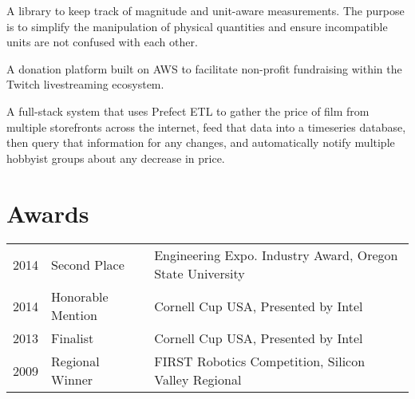 \documentclass[letterpaper]{deedy-resume} %
\begin{document}
\begin{minipage}[t]{0.99\textwidth}
\sectionspace %



A library to keep track of magnitude and unit-aware measurements.
The purpose is to simplify the manipulation of physical quantities and ensure incompatible units are not confused with each other.

\sectionspace %



A donation platform built on AWS to facilitate non-profit fundraising within the Twitch livestreaming ecosystem.

\sectionspace %



A full-stack system that uses Prefect ETL to gather the price of film from multiple storefronts across the internet, feed that data into a timeseries database, then query that information for any changes, and automatically notify multiple hobbyist groups about any decrease in price.

\sectionspace %


\section{Awards} 

\begin{tabular}{rll}
2014	 & Second Place & Engineering Expo. Industry Award, Oregon State University\\
2014	 & Honorable Mention & Cornell Cup USA, Presented by Intel\\
2013	 & Finalist & Cornell Cup USA, Presented by Intel\\
2009	 & Regional Winner & FIRST Robotics Competition, Silicon Valley Regional\\
\end{tabular}


\end{minipage}
\end{document}

